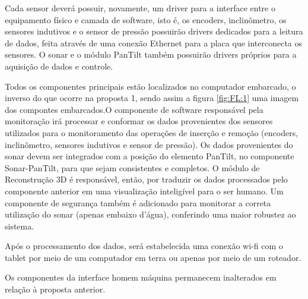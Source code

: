 
Cada sensor deverá possuir, novamente, um driver para a interface entre o
equipamento físico e camada de software, isto é, os encoders, inclinômetro, os
sensores indutivos e o sensor de pressão possuirão drivers dedicados para a
leitura de dados, feita através de uma conexão Ethernet para a placa que
interconecta os sensores. O sonar e o módulo PanTilt também possuirão drivers
próprios para a aquisição de dados e controle.

Todos os componentes principais estão localizados no computador embarcado, o
inverso do que ocorre na proposta 1, sendo assim a figura \ref{fig:FL:1} uma
imagem dos compontes embarcados.O componente de software responsável pela
monitoração irá processar e conformar os dados provenientes dos sensores
utilizados para o monitoramento das operações de inserção e remoção (encoders,
inclinômetro, sensores indutivos e sensor de pressão). Os dados provenientes do
sonar devem ser integrados com a posição do elemento PanTilt, no componente
Sonar-PanTilt, para que sejam consistentes e completos. O módulo de Reconstrução
3D é responsável, então, por  traduzir os dados processados pelo componente
anterior em uma visualização inteligível para o ser humano. Um componente de
segurança também é adicionado para monitorar a correta utiliza\-ção do sonar
(apenas embaixo d’água), conferindo uma maior robustez ao sistema.

Após o processamento dos dados, será estabelecida uma conexão wi-fi com o tablet
por meio de um computador em terra ou
 apenas por meio de um roteador.
 
Os componentes da interface homem máquina permanecem inalterados em relação à
proposta anterior.